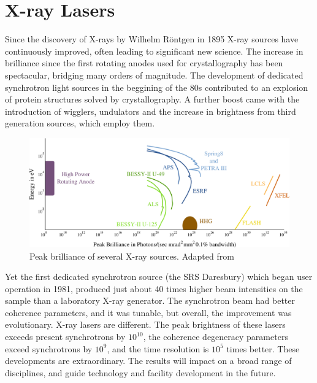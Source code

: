 \chapter{X-ray Lasers}
\label{Ultrashort X-ray Sources}\noindent
 
Since the discovery of X-rays by Wilhelm R\"{o}ntgen in 1895 X-ray sources have
continuously improved, often leading to significant new science. The increase in
brilliance since the first rotating anodes used for crystallography has been
spectacular, bridging many orders of magnitude. The development of dedicated
synchrotron light sources in the beggining of the 80s contributed to an explosion of
protein structures solved by crystallography. A further boost came with
the introduction of wigglers, undulators and the increase in brightness from
third generation sources, which employ them.

 
\begin{figure}[h]
\centering
  \includegraphics[width=1.0 \columnwidth]{brilliance.png}
  \caption{Peak brilliance of several X-ray sources. 
    Adapted from \cite{Ackermann2007Operation,Materlik2001TESLA}}
  \label{Fig:Brilliance}
\end{figure}

Yet the first dedicated synchrotron source (the SRS Daresbury) which began user
operation in 1981, produced just about 40 times higher beam intensities on the
sample than a laboratory X-ray generator. The synchrotron beam had better
coherence parameters, and it was tunable, but overall, the improvement was
evolutionary. X-ray lasers are different. The peak brightness of these lasers
exceeds present synchrotrons by $10^{10}$, the coherence degeneracy parameters exceed
synchrotrons by $10^9$, and the time resolution is $10^5$ times better. These
developments are extraordinary. The results will impact on a broad range of
disciplines, and guide technology and facility development in the future. 
 
